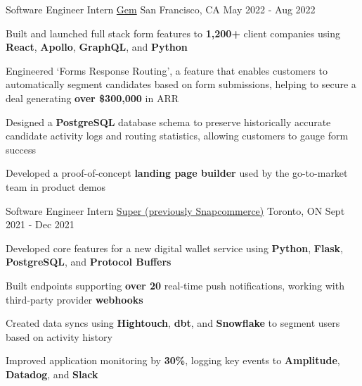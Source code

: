 
\begin{cventries}
  \cventry
    {Software Engineer Intern} %
    {\href{https://www.gem.com/}{Gem}} %
    {San Francisco, CA} %
    {May 2022 - Aug 2022} %
    {
      \begin{cvitems} %
      \item {Built and launched full stack form features to \textbf{1,200+} client companies using \textbf{React}, \textbf{Apollo}, \textbf{GraphQL}, and \textbf{Python}}
      \item {Engineered `Forms Response Routing', a feature that enables customers to automatically segment candidates based on form submissions, helping to secure a deal generating \textbf{over \$300,000} in ARR}
      \item {Designed a \textbf{PostgreSQL} database schema to preserve historically accurate candidate activity logs and routing statistics, allowing customers to gauge form success}
      \item {Developed a proof-of-concept \textbf{landing page builder} used by the go-to-market team in product demos}
      \end{cvitems}
    }

  \cventry
    {Software Engineer Intern} %
    {\href{https://www.super.com/}{Super (previously Snapcommerce)}} %
    {Toronto, ON} %
    {Sept 2021 - Dec 2021} %
    {
      \begin{cvitems} %
      \item {Developed core features for a new digital wallet service using \textbf{Python}, \textbf{Flask}, \textbf{PostgreSQL}, and \textbf{Protocol Buffers}}
      \item {Built endpoints supporting \textbf{over 20} real-time push notifications, working with third-party provider \textbf{webhooks}}
      \item {Created data syncs using \textbf{Hightouch}, \textbf{dbt}, and \textbf{Snowflake} to segment users based on activity history}
      \item {Improved application monitoring by \textbf{30\%}, logging key events to \textbf{Amplitude}, \textbf{Datadog}, and \textbf{Slack}}
      \end{cvitems}
    }


\end{cventries}
